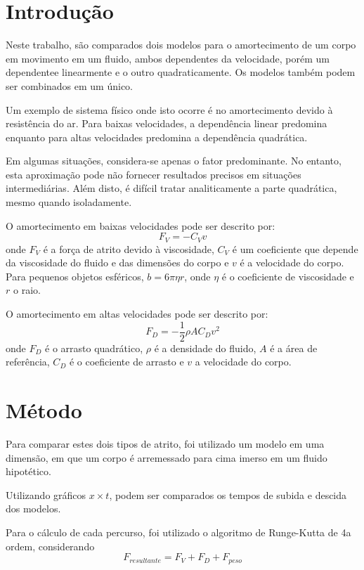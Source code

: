 \section{Introdução} 
Neste trabalho, são comparados dois modelos para o amortecimento de um corpo em movimento em um fluido, ambos dependentes da velocidade, porém um dependentee linearmente e o outro quadraticamente. Os modelos também podem ser combinados em um único.

Um exemplo de sistema físico onde isto ocorre é no amortecimento devido à resistência do ar. Para baixas velocidades, a dependência linear predomina enquanto para altas velocidades predomina a dependência quadrática.

Em algumas situações, considera-se apenas o fator predominante. No entanto, esta aproximação pode não fornecer resultados precisos em situações intermediárias. Além disto, é difícil tratar analiticamente a parte quadrática, mesmo quando isoladamente.

O amortecimento em baixas velocidades pode ser descrito por\cite{stokes_wiki}:
$$F_V=-C_V v$$
onde $F_V$ é a força de atrito devido à viscosidade, $C_V$ é um coeficiente que depende da viscosidade do fluido e das dimensões do corpo e $v$ é a velocidade do corpo. Para pequenos objetos esféricos, $b=6\pi \eta r$, onde $\eta$ é o coeficiente de viscosidade e $r$ o raio.

O amortecimento em altas velocidades pode ser descrito por\cite{drag1_wiki}:
$$F_D=-\frac{1}{2}\rho A C_D v^2$$
onde $F_D$ é o arrasto quadrático, $\rho$ é a densidade do fluido, $A$ é a área de referência, $C_D$ é o coeficiente de arrasto e $v$ a velocidade do corpo.

\section{Método}
Para comparar estes dois tipos de atrito, foi utilizado um modelo em uma dimensão, em que um corpo é arremessado para cima imerso em um fluido hipotético.

Utilizando gráficos $x\times t$, podem ser comparados os tempos de subida e descida dos modelos.

Para o cálculo de cada percurso, 
foi utilizado o algoritmo de Runge-Kutta de 4a ordem, considerando
$$F_{resultante}=F_V+F_D+F_{peso}$$


